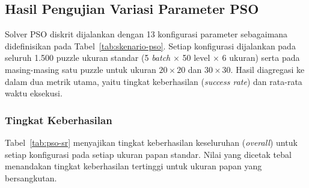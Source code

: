 \subsection{Hasil Pengujian Variasi Parameter PSO}
\label{subsec:hasil-pso}

Solver PSO diskrit dijalankan dengan 13 konfigurasi parameter sebagaimana didefinisikan pada Tabel~\ref{tab:skenario-pso}. Setiap konfigurasi dijalankan pada seluruh 1.500 puzzle ukuran standar (5 \textit{batch} $\times$ 50 level $\times$ 6 ukuran) serta pada masing-masing satu puzzle untuk ukuran $20 \times 20$ dan $30 \times 30$. Hasil diagregasi ke dalam dua metrik utama, yaitu tingkat keberhasilan (\textit{success rate}) dan rata-rata waktu eksekusi.

\subsubsection{Tingkat Keberhasilan}

Tabel~\ref{tab:pso-sr} menyajikan tingkat keberhasilan keseluruhan (\textit{overall}) untuk setiap konfigurasi pada setiap ukuran papan standar. Nilai yang dicetak tebal menandakan tingkat keberhasilan tertinggi untuk ukuran papan yang bersangkutan.

